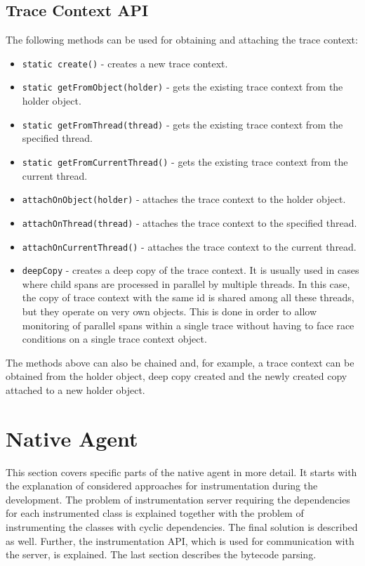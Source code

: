 \subsection{Trace Context API}
\label{imp:trace_context_api}
The following methods can be used for obtaining and attaching the trace context:
\begin{itemize}
	\item \texttt{static create()} - creates a new trace context.
	\item \texttt{static getFromObject(holder)} - gets the existing trace context from the holder object.
	\item \texttt{static getFromThread(thread)} - gets the existing trace context from the specified thread.
	\item \texttt{static getFromCurrentThread()} -  gets the existing trace context from the current thread.
	\item \texttt{attachOnObject(holder)} - attaches the trace context to the holder object.
	\item \texttt{attachOnThread(thread)} - attaches the trace context to the specified \newline thread.
	\item \texttt{attachOnCurrentThread()} - attaches the trace context to the current \newline thread.
	\item \texttt{deepCopy} - creates a deep copy of the trace context. It is usually used in cases where child spans are processed in parallel by multiple threads. In this case, the copy of trace context with the same id is shared among all these threads, but they operate on very own objects. This is done in order to allow monitoring of parallel spans within a single trace without having to face race conditions on a single trace context object.
\end{itemize}

The methods above can also be chained and, for example, a trace context can be obtained from the holder object, deep copy created and the newly created copy attached to a new holder object.


\section{Native Agent}
This section covers specific parts of the native agent in more detail. It starts with the explanation of considered approaches for instrumentation during the development. The problem of instrumentation server requiring the dependencies for each instrumented class is explained together with the problem of instrumenting the classes with cyclic dependencies. The final solution is described as well. Further, the instrumentation API, which is used for communication with the server, is explained. The last section describes the bytecode parsing.
